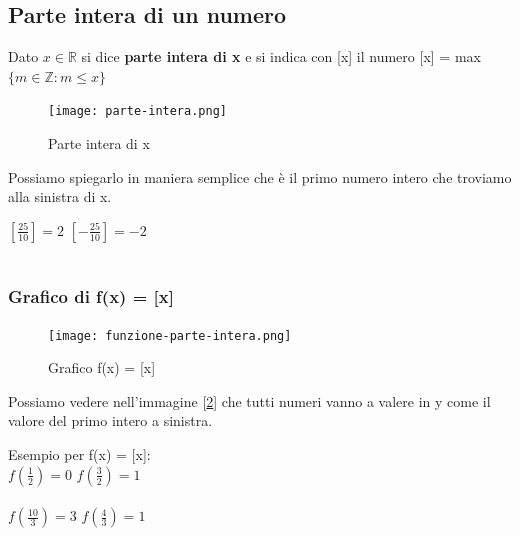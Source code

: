 \subsection{Parte intera di un numero}
\begin{definition}
    Dato $x \in \mathbb{R}$ si dice \textbf{parte intera di x} e si indica con [x] il numero [x] = max$\{m \in \mathbb{Z}: m \leq x\}$
\end{definition}
\begin{figure}
    \vspace{-15pt}
    \centering
    \texttt{[image: parte-intera.png]}
    \caption{Parte intera di x}
    \label{fig:my_label}
\end{figure}
Possiamo spiegarlo in maniera semplice che è il primo numero intero che troviamo alla sinistra di x.
\begin{example}
    $[\frac{25}{10}] = 2$ \hspace{.5cm} $[-\frac{25}{10}] = -2$\\ \\
\end{example}

\vspace{-20pt}
\subsubsection{Grafico di f(x) = [x]}
\begin{figure}
    \vspace{-25pt}
    \centering
    \texttt{[image: funzione-parte-intera.png]}
    \caption{Grafico f(x) = [x]}
    \label{fig:funzione-parte-intera}
\end{figure}
\vspace{20pt}
Possiamo vedere nell'immagine [\ref{fig:funzione-parte-intera}] che tutti numeri vanno a valere in y come il valore del primo intero a sinistra.
\begin{example}
    Esempio per f(x) = [x]:\\
    $f(\frac{1}{2}) = 0$ \hspace{.3cm} $f(\frac{3}{2}) = 1$\\ \\
    $f(\frac{10}{3}) = 3$ \hspace{.3cm} $f(\frac{4}{3}) = 1$\\ \\ \\
\end{example}

